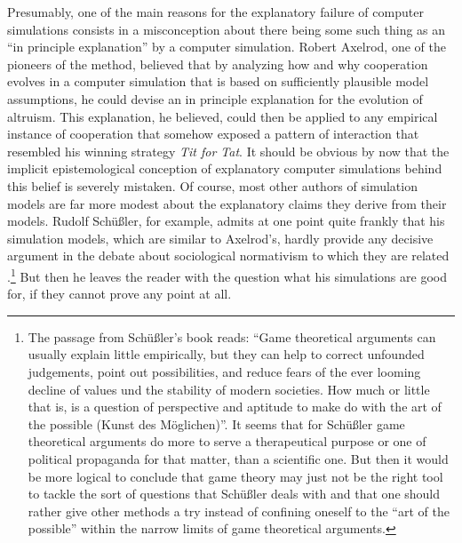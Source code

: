 Presumably, one of the main reasons for the explanatory failure of computer
simulations consists in a misconception about there being some such thing as
an ``in principle explanation'' by a computer simulation. Robert Axelrod, one
of the pioneers of the method, believed that by analyzing
how and why cooperation evolves in a computer simulation that is based on
sufficiently plausible model assumptions, he could devise an in principle
explanation for the evolution of altruism. This explanation, he believed,
could then be applied to any empirical instance of cooperation that somehow
exposed a pattern of interaction that resembled his winning strategy {\em Tit
for Tat}. It should be obvious by now that the implicit epistemological
conception of explanatory computer simulations behind this belief is severely
mistaken. Of course, most other authors of simulation models are far more
modest about the explanatory claims they derive from their models. Rudolf
Schüßler, for example, admits at one point quite frankly that his simulation
models, which are similar to Axelrod's, hardly provide any decisive argument
in the debate about sociological normativism to which they are related
\cite[p. 91]{schuessler:1997}.\footnote{The passage from Schüßler's book
reads: ``Game theoretical arguments can usually explain little empirically, but
they can help to correct unfounded judgements, point out possibilities, and
reduce fears of the ever looming decline of values und the stability of modern
societies. How much or little that is, is a question of perspective and
aptitude to make do with the art of the possible (Kunst des Möglichen)''. It
seems that for Schüßler game theoretical arguments do more to serve a
therapeutical purpose or one of political propaganda for that matter, than a
scientific one. But then it would be more logical to conclude that game
theory may just not be the right tool to tackle the sort of questions that
Schüßler deals with and that one should rather give other methods a try
instead of confining oneself to the ``art of the possible'' within the
narrow limits of game theoretical arguments. 
} But then he leaves the reader with the
question what his simulations are good for, if they cannot prove any point at
all.

